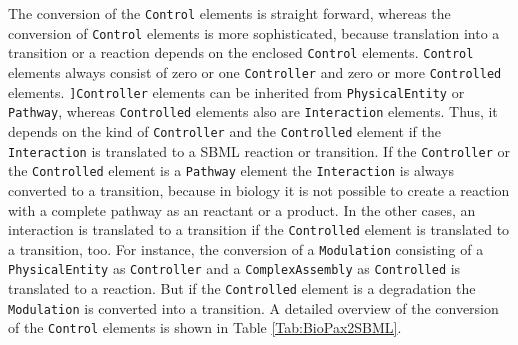 \documentclass{bioinfo}
\begin{document}
\begin{methods}
The conversion of the \texttt{Control} elements is straight forward, whereas the conversion of \texttt{Control} elements is more sophisticated, because translation into a transition or a reaction depends on the enclosed \texttt{Control} elements.
\texttt{Control} elements always consist of zero or one \texttt{Controller} and zero or more \texttt{Controlled} elements.
\texttt{]Controller} elements can be inherited from \texttt{PhysicalEntity} or \texttt{Pathway}, whereas \texttt{Controlled} elements also are \texttt{Interaction} elements.
Thus, it depends on the kind of \texttt{Controller} and the \texttt{Controlled} element if the \texttt{Interaction} is translated to a SBML reaction or transition.
If the \texttt{Controller} or the \texttt{Controlled} element is a \texttt{Pathway} element the \texttt{Interaction} is always converted to a transition, because in biology it is not possible to create a reaction with a complete pathway as an reactant or a product.
In the other cases, an interaction is translated to a transition if the \texttt{Controlled} element is translated to a transition, too.
For instance, the conversion of a \texttt{Modulation} consisting of a \texttt{PhysicalEntity} as \texttt{Controller} and a \texttt{ComplexAssembly} as \texttt{Controlled} is translated to a reaction.
But if the \texttt{Controlled} element is a degradation the \texttt{Modulation} is converted into a transition.
A detailed overview of the conversion of the \texttt{Control} elements is shown in Table \ref{Tab:BioPax2SBML}.


\end{methods}
\end{document}
